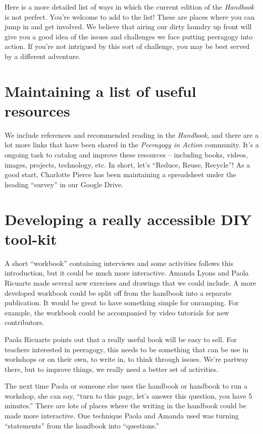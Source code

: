 Here is a more detailed list of ways in which the current edition of the
\emph{Handbook} is not perfect. You're welcome to add to the list! These
are places where you can jump in and get involved. We believe that
airing our dirty laundry up front will give you a good idea of the
issues and challenges we face putting peeragogy into action. If you're
not intrigued by this sort of challenge, you may be best served by a
different adventure.

\section*{Maintaining a list of useful
resources}\label{maintaining-a-list-of-useful-resources}

We include references and recommended reading in the \emph{Handbook},
and there are a lot more links that have been shared in the \emph{Peeragogy in
Action} community. It's a ongoing task to catalog and improve these
resources -- including books, videos, images, projects, technology, etc.
In short, let's ``Reduce, Reuse, Recycle''! As a good start, Charlotte
Pierce has been maintaining a spreadsheet under the heading ``survey''
in our Google Drive.

\section*{Developing a really accessible DIY
tool-kit}\label{developing-a-really-accessible-diy-tool-kit}

A short ``workbook'' containing interviews and some activities follows
this introduction, but it could be much more interactive. Amanda Lyons
and Paola Ricuarte made several new exercises and drawings that we could
include. A more developed workbook could be split off from the handbook
into a separate publication. It would be great to have something simple
for onramping. For example, the workbook could be accompanied by video
tutorials for new contributors.

Paola Ricuarte points out that a really useful book will be easy to
sell. For teachers interested in peeragogy, this needs to be something
that can be use in workshops or on their own, to write in, to think
through issues. We're partway there, but to improve things, we really
need a better set of activities.

The next time Paola or someone else uses the handbook or handbook to run
a workshop, she can say, ``turn to this page, let's answer this
question, you have 5 minutes.'' There are lots of places where the
writing in the handbook could be made more interactive. One technique
Paola and Amanda used was turning ``statements'' from the handbook into
``questions.''


